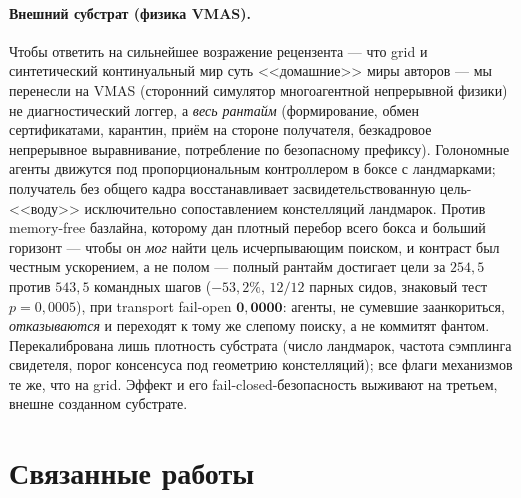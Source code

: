 \documentclass{article}
\begin{document}
\paragraph{Внешний субстрат (физика VMAS).}
Чтобы ответить на сильнейшее возражение рецензента --- что grid и
синтетический континуальный мир суть <<домашние>> миры авторов --- мы
перенесли на VMAS (сторонний симулятор многоагентной непрерывной
физики) не диагностический логгер, а \emph{весь рантайм}
(формирование, обмен сертификатами, карантин, приём на стороне
получателя, безкадровое непрерывное выравнивание, потребление по
безопасному префиксу). Голономные агенты движутся под
пропорциональным контроллером в боксе с ландмарками; получатель без
общего кадра восстанавливает засвидетельствованную цель-<<воду>>
исключительно сопоставлением констелляций ландмарок. Против
memory-free базлайна, которому дан плотный перебор всего бокса и
больший горизонт --- чтобы он \emph{мог} найти цель исчерпывающим
поиском, и контраст был честным ускорением, а не полом --- полный
рантайм достигает цели за $254{,}5$ против $543{,}5$ командных шагов
($-53{,}2\%$, $12/12$ парных сидов, знаковый тест $p=0{,}0005$), при
transport fail-open $\mathbf{0{,}0000}$: агенты, не сумевшие
заанкориться, \emph{отказываются} и переходят к тому же слепому
поиску, а не коммитят фантом. Перекалибрована лишь плотность субстрата
(число ландмарок, частота сэмплинга свидетеля, порог консенсуса под
геометрию констелляций); все флаги механизмов те же, что на grid.
Эффект и его fail-closed-безопасность выживают на третьем, внешне
созданном субстрате.

\section{Связанные работы}
\label{p5:sec:related}
\end{document}
